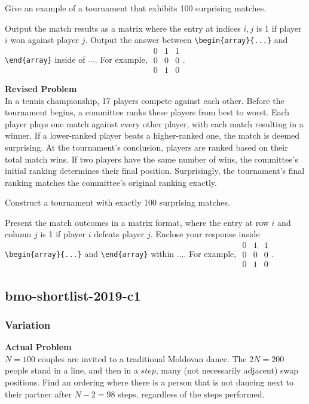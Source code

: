 Give an example of a tournament that exhibits 100 surprising matches.

Output the match results as a matrix where the entry at indices $i,j$ is 1 if player $i$ won against player $j$. Output the answer between \verb|\begin{array}{...}| and \verb|\end{array}| inside of $\boxed{...}$. For example, $\boxed{\begin{array}{ccc}0 & 1 & 1 \\ 0 & 0 & 0 \\ 0 & 1 & 0\end{array}}$.

\textbf{Revised Problem}\\
In a tennis championship, 17 players compete against each other. Before the tournament begins, a committee ranks these players from best to worst. Each player plays one match against every other player, with each match resulting in a winner. If a lower-ranked player beats a higher-ranked one, the match is deemed surprising. At the tournament's conclusion, players are ranked based on their total match wins. If two players have the same number of wins, the committee's initial ranking determines their final position. Surprisingly, the tournament's final ranking matches the committee's original ranking exactly.

Construct a tournament with exactly 100 surprising matches.

Present the match outcomes in a matrix format, where the entry at row $i$ and column $j$ is 1 if player $i$ defeats player $j$. Enclose your response inside \verb|\begin{array}{...}| and \verb|\end{array}| within $\boxed{...}$. For example, $\boxed{\begin{array}{ccc}0 & 1 & 1 \\ 0 & 0 & 0 \\ 0 & 1 & 0\end{array}}$.

\subsection{bmo-shortlist-2019-c1}
\subsubsection{Variation}
\textbf{Actual Problem}\\
$N=100$ couples are invited to a traditional Moldovan dance. The $2N=200$ people stand in a line, and then in a $\textit{step}$, many (not necessarily adjacent) swap positions. Find an ordering where there is a person that is not dancing next to their partner after $N-2=98$ steps, regardless of the steps performed.

